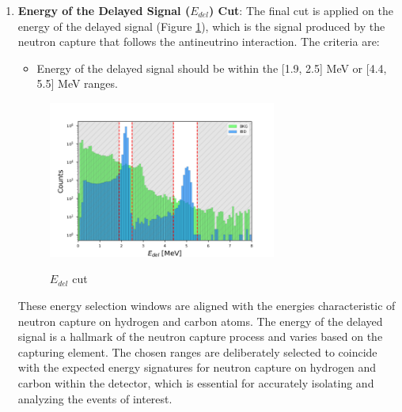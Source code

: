 \begin{enumerate}
	\item \textbf{Energy of the Delayed Signal ($E_{del}$) Cut}: The final cut is applied on the energy of the delayed signal (Figure \ref{fig:e_del_cut}), which is the signal produced by the neutron capture that follows the antineutrino interaction. The criteria are:
	\begin{itemize}
		\item Energy of the delayed signal should be within the [1.9, 2.5] MeV or [4.4, 5.5] MeV ranges.
	\end{itemize}
	
	\begin{adjustbox}{minipage={\linewidth}, valign=t}
		
		\begin{figure}
			
			\vspace{-2\baselineskip}
			\caption{$E_{del}$ cut}
			\vspace{-0.5\baselineskip}
			\includegraphics[width=7.5cm]{Images/Cut/e_del.png}
			\label{fig:e_del_cut}
			
		\end{figure}
		
		\vspace*{0.15cm}
		
		These energy selection windows are aligned with the energies characteristic of neutron capture on hydrogen and carbon atoms. The energy of the delayed signal is a hallmark of the neutron capture process and varies based on the capturing element. The chosen ranges are deliberately selected to coincide with the expected energy signatures for neutron capture on hydrogen and carbon within the detector, which is essential for accurately isolating and analyzing the events of interest.
		\newline
		
	\end{adjustbox}

\end{enumerate}

